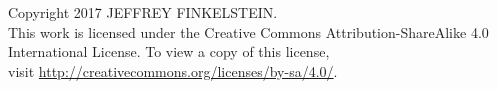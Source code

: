 \newenvironment{copyrightpage}
  {%
  \thispagestyle{empty}%
  \setlength{\parindent}{0pt}%
  \null
  \vfill
  }
  {\newpage}

\begin{copyrightpage}
  Copyright 2017 \uppercase{Jeffrey Finkelstein}.\\
  This work is licensed under the Creative Commons Attribution-ShareAlike 4.0\\ International License. To view a copy of this license,\\ visit \url{http://creativecommons.org/licenses/by-sa/4.0/}.
\end{copyrightpage}
